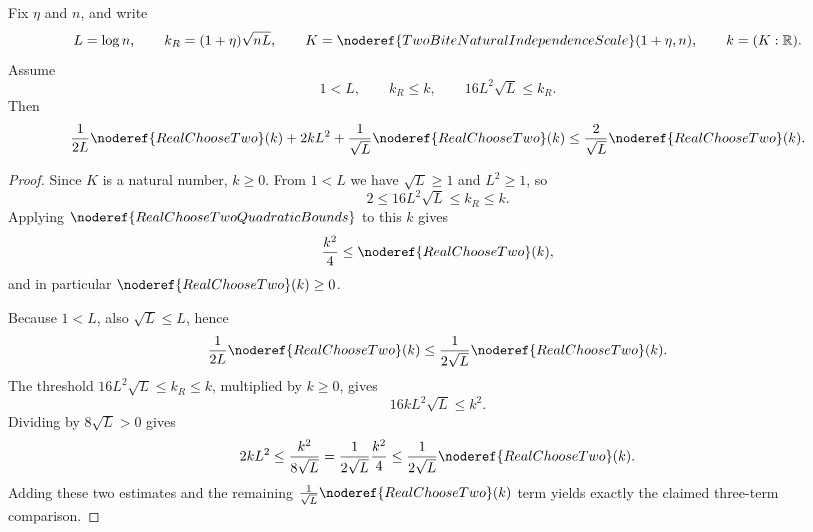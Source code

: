 \begin{helper}
Fix \(\eta\) and \(n\), and write
\[
L=\log n,\qquad
k_R=(1+\eta)\sqrt{nL},\qquad
K=\noderef{TwoBiteNaturalIndependenceScale}(1+\eta,n),\qquad
k=(K:\mathbb R).
\]
Assume
\[
1<L,\qquad k_R\le k,\qquad 16L^2\sqrt L\le k_R.
\]
Then
\[
\frac1{2L}\noderef{RealChooseTwo}(k)+2kL^2+
\frac1{\sqrt L}\noderef{RealChooseTwo}(k)
\le
\frac2{\sqrt L}\noderef{RealChooseTwo}(k).
\]
\end{helper}
\begin{proof}
Since \(K\) is a natural number, \(k\ge0\).  From \(1<L\) we have
\(\sqrt L\ge1\) and \(L^2\ge1\), so
\[
2\le16L^2\sqrt L\le k_R\le k.
\]
Applying \(\noderef{RealChooseTwoQuadraticBounds}\) to this \(k\) gives
\[
\frac{k^2}{4}\le\noderef{RealChooseTwo}(k),
\]
and in particular \(\noderef{RealChooseTwo}(k)\ge0\).

Because \(1<L\), also \(\sqrt L\le L\), hence
\[
\frac1{2L}\noderef{RealChooseTwo}(k)
\le
\frac1{2\sqrt L}\noderef{RealChooseTwo}(k).
\]
The threshold \(16L^2\sqrt L\le k_R\le k\), multiplied by \(k\ge0\), gives
\[
16kL^2\sqrt L\le k^2.
\]
Dividing by \(8\sqrt L>0\) gives
\[
2kL^2\le\frac{k^2}{8\sqrt L}
=\frac1{2\sqrt L}\frac{k^2}{4}
\le\frac1{2\sqrt L}\noderef{RealChooseTwo}(k).
\]
Adding these two estimates and the remaining
\(\frac1{\sqrt L}\noderef{RealChooseTwo}(k)\) term yields exactly the claimed
three-term comparison.
\end{proof}
